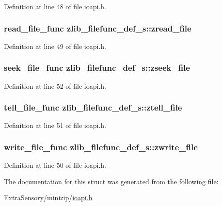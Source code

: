 Definition at line 48 of file ioapi.\+h.

\hypertarget{structzlib__filefunc__def__s_ab14f748de7516525e5d2b78c47aca92e}{
\subsubsection[{zread\+\_\+file}]{\setlength{\rightskip}{0pt plus 5cm}read\+\_\+file\+\_\+func zlib\+\_\+filefunc\+\_\+def\+\_\+s\+::zread\+\_\+file}}\label{structzlib__filefunc__def__s_ab14f748de7516525e5d2b78c47aca92e}


Definition at line 49 of file ioapi.\+h.

\hypertarget{structzlib__filefunc__def__s_a4747bdf97a3f44fe4b958114c11e1dcf}{
\subsubsection[{zseek\+\_\+file}]{\setlength{\rightskip}{0pt plus 5cm}seek\+\_\+file\+\_\+func zlib\+\_\+filefunc\+\_\+def\+\_\+s\+::zseek\+\_\+file}}\label{structzlib__filefunc__def__s_a4747bdf97a3f44fe4b958114c11e1dcf}


Definition at line 52 of file ioapi.\+h.

\hypertarget{structzlib__filefunc__def__s_ac8b933601443cdd83f8cc02004c77d0d}{
\subsubsection[{ztell\+\_\+file}]{\setlength{\rightskip}{0pt plus 5cm}tell\+\_\+file\+\_\+func zlib\+\_\+filefunc\+\_\+def\+\_\+s\+::ztell\+\_\+file}}\label{structzlib__filefunc__def__s_ac8b933601443cdd83f8cc02004c77d0d}


Definition at line 51 of file ioapi.\+h.

\hypertarget{structzlib__filefunc__def__s_a710b490fec793486ef5bedd9f2e1136d}{
\subsubsection[{zwrite\+\_\+file}]{\setlength{\rightskip}{0pt plus 5cm}write\+\_\+file\+\_\+func zlib\+\_\+filefunc\+\_\+def\+\_\+s\+::zwrite\+\_\+file}}\label{structzlib__filefunc__def__s_a710b490fec793486ef5bedd9f2e1136d}


Definition at line 50 of file ioapi.\+h.



The documentation for this struct was generated from the following file\+:\begin{DoxyCompactItemize}
\item 
Extra\+Sensory/minizip/\hyperlink{ioapi_8h}{ioapi.\+h}\end{DoxyCompactItemize}
